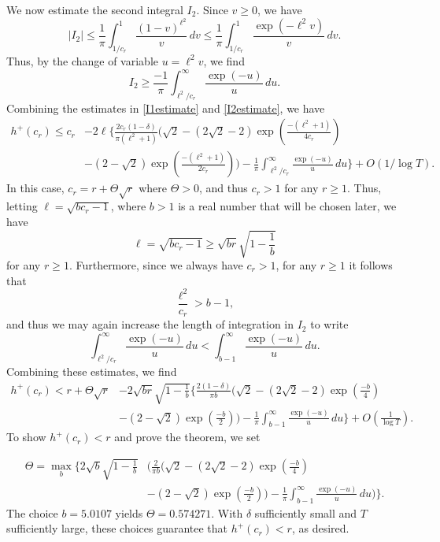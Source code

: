 \documentclass[oneside]{amsart}
\begin{document}
We now estimate the second integral $I_2$. Since $v\ge0$, we have 
\[
|I_2| \le \frac{1}{\pi}\int_{1/c_r}^{1}\frac{(1-v)^{\ell^2}}{v}\,dv \le \frac{1}{\pi}\int_{1/c_r}^{1}\frac{\exp(-\ell^2v)}{v}\,dv.
\]
Thus, by the change of variable $u=\ell^2v$, we find
\begin{equation}\label{I2estimate}
I_2 \ge \frac{-1}{\pi}\int_{\ell^2/c_r}^{\infty}\frac{\exp(-u)}{u}\,du.
\end{equation}
Combining the estimates in \eqref{I1estimate} and \eqref{I2estimate}, we have
\begin{equation*}\label{Hestimate}
\begin{split}
h^+(c_r) \le c_r&-2\ell\biggl\{\frac{2c_r(1-\delta)}{\pi(\ell^2+1)}\biggl(\sqrt{2}- (2\sqrt{2}-2)\exp\left(\frac{-(\ell^2+1)}{4c_r} \right)\\ &-(2-\sqrt{2})\exp\left(\frac{-(\ell^2+1)}{2c_r} \right)\biggr)- \frac{1}{\pi}\int_{\ell^2/c_r}^{\infty}\frac{\exp(-u)}{u}\,du\biggr\}  +O\left(1/\log T\right).
\end{split}
\end{equation*}
In this case, $c_r = r+\Theta\sqrt{r}$ where $\Theta>0$, and thus $c_r >1$ for any $r\ge 1$. Thus, letting $\ell= \sqrt{bc_r-1}$, where $b>1$ is a real number that will be chosen later, we have
\[
\ell = \sqrt{bc_r-1} \ge \sqrt{br}\sqrt{1-\frac{1}{b}}
\]
for any $r\ge 1$. Furthermore, since we always have $c_r > 1$, for any $r\ge 1$ it follows that
\[
\frac{\ell^2}{c_r}> b-1,
\]
and thus we may again increase the length of integration in $I_2$ to write
\[
\int_{\ell^2/c_r}^{\infty}\frac{\exp(-u)}{u}\,du < \int_{b-1}^{\infty}\frac{\exp(-u)}{u}\,du.
\]
Combining these estimates, we find  
\begin{equation*}\begin{split}
h^+(c_r) < r+ \Theta\sqrt{r} &- 2\sqrt{br}\sqrt{1-\frac{1}{b}}\biggl\{\frac{2(1-\delta)}{\pi b}\biggl(\sqrt{2}-(2\sqrt{2}-2)\exp\left(\frac{-b}{4}\right)\\
&-(2-\sqrt{2})\exp\left(\frac{-b}{2}\right)\biggr)-\frac{1}{\pi}\int_{b-1}^{\infty}\frac{\exp(-u)}{u}\,du\biggr\}  +O\left(\frac{1}{\log T}\right).
\end{split}\end{equation*}
To show $h^+(c_r)< r$ and prove the theorem, we set

\begin{equation*}\begin{split}
\Theta = \max_{b}\biggl\{2\sqrt{b}\sqrt{1-\frac{1}{b}}&\biggl(\frac{2}{\pi b}\biggl(\sqrt{2}-(2\sqrt{2}-2)\exp\left(\frac{-b}{4}\right)\\
&-(2-\sqrt{2})\exp\left(\frac{-b}{2}\right)\biggr)-\frac{1}{\pi}\int_{b-1}^{\infty}\frac{\exp(-u)}{u}\,du\biggr)\biggr\}.
\end{split}\end{equation*}
The choice $b=5.0107$ yields $\Theta=0.574271$. With $\delta$ sufficiently small and $T$ sufficiently large, these choices guarantee that $h^+(c_r)<r$, as desired. 
\end{document}
